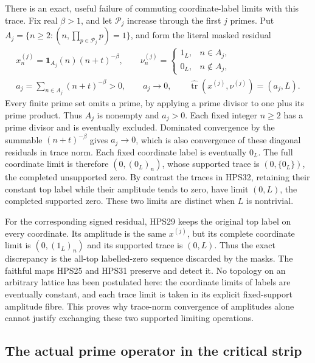 There is an exact, useful failure of commuting
coordinate-label limits with this trace.
Fix real $\beta>1$, and let $\mathcal P_j$
increase through the first $j$ primes.
Put $A_j=\{n\ge2:(n,\prod_{p\in\mathcal P_j}p)=1\}$,
and form the literal masked residual
\begin{equation}\tag{HPS32}
\begin{gathered}
 x^{(j)}_n=\mathbf1_{A_j}(n)(n+t)^{-\beta},
 \qquad
 \nu^{(j)}_n=
   \begin{cases}1_L,&n\in A_j,\\0_L,&n\notin A_j,\end{cases}\\
 a_j=\sum_{n\in A_j}(n+t)^{-\beta}>0,\qquad
 a_j\longrightarrow0,\qquad
 \widehat{\operatorname{tr}}(x^{(j)},\nu^{(j)})
                         =(a_j,L).
\end{gathered}
\end{equation}
Every finite prime set omits a prime, by
applying a prime divisor to one plus its
prime product. Thus $A_j$ is nonempty and
$a_j>0$. Each fixed integer $n\ge2$
has a prime divisor and is eventually
excluded. Dominated convergence by the
summable $(n+t)^{-\beta}$ gives
$a_j\to0$, which is also convergence
of these diagonal residuals in trace norm.
Each fixed coordinate label is eventually
$0_L$. The full coordinate limit is
therefore $(0,(0_L)_n)$, whose supported
trace is $(0,\{0_L\})$, the completed
unsupported zero. By contrast the traces
in HPS32, retaining their constant top
label while their amplitude tends to zero,
have limit $(0,L)$, the completed supported
zero. These two limits are distinct when
$L$ is nontrivial.

For the corresponding signed residual,
HPS29 keeps the original top label on
every coordinate. Its amplitude is the
same $x^{(j)}$, but its complete
coordinate limit is $(0,(1_L)_n)$ and
its supported trace is $(0,L)$.
Thus the exact discrepancy is the
all-top labelled-zero sequence discarded
by the masks. The faithful maps HPS25
and HPS31 preserve and detect it.
No topology on an arbitrary lattice
has been postulated here: the coordinate
limits of labels are eventually constant,
and each trace limit is taken in its
explicit fixed-support amplitude fibre.
This proves why trace-norm convergence of
amplitudes alone cannot justify exchanging
these two supported limiting operations.

\subsection{The actual prime operator in the critical strip}

